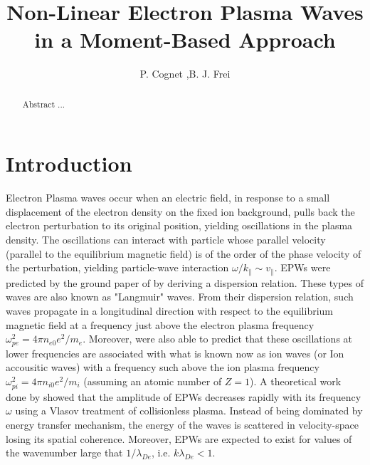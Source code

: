 \documentclass[final]{jpp}
\title{Non-Linear Electron Plasma Waves in a Moment-Based Approach}
\author{P. Cognet \aff{1},B. J. Frei\aff{1}
  \corresp{\email{baptiste.frei@epfl.ch}}}
\affiliation{\aff{1} \'Ecole Polytechnique F\'ed\'erale de Lausanne (EPFL),
  Swiss Plasma Center,
CH-1015 Lausanne, Switzerland}
\begin{document}
\maketitle

\begin{abstract}
Abstract ...
\end{abstract}

\section{Introduction}

Electron Plasma waves occur when an electric field, in response to a small displacement of the electron density on the fixed ion background, pulls back the electron perturbation to its original position, yielding oscillations in the plasma density. The oscillations can interact with particle whose parallel velocity (parallel to the equilibrium magnetic field) is of the order of the phase velocity of the perturbation, yielding particle-wave interaction $\omega / k_\parallel \sim v_\parallel$. EPWs were predicted by the ground paper of \citet{Tonks1929} by deriving a dispersion relation. These types of waves are also known as "Langmuir" waves. From their dispersion relation, such waves propagate in a longitudinal direction with respect to the equilibrium magnetic field at a frequency just above the electron plasma frequency $\omega_{pe}^2 = 4 \pi n_{e0}e^2/m_e$. Moreover, \citet{Tonks1929} were also able to predict that these oscillations at lower frequencies are associated with what is known now as ion waves (or Ion accousitic waves) with a frequency such above the ion plasma frequency $\omega_{pi}^2 = 4 \pi n_{i0} e^2 / m_i$ (assuming an atomic number of $Z=1$). A theoretical work done by \citet{Landau1946} showed that the amplitude of EPWs decreases rapidly with its frequency $\omega$ using a Vlasov treatment of collisionless plasma. Instead of being dominated by energy transfer mechanism, the energy of the waves is scattered in velocity-space losing its spatial coherence. Moreover, EPWs are expected to exist for values of the wavenumber large that $1/\lambda_{De}$, i.e. $k \lambda_{De} < 1$. 
\end{document}
